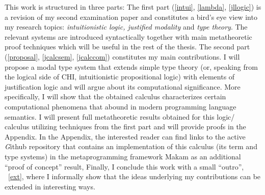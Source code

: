            This work  is structured in three parts: 
           The first part (\cref{intui}, \cref{lambda}, \cref{jllogic}) is a revision of my second examination paper and constitutes 
           a bird's eye view into my 
           research topics:  
           \emph{intuitionistic logic, justified modality} and \emph{type theory}. 
           The relevant systems are introduced syntactically together with main 
            metatheoretic proof techniques which will be useful 
           in the rest of the thesis.
           The second part (\cref{proposal}, \cref{jcalcsem}, \cref{jcalccom}) 
           constitutes my main contributions.
           I will propose  
           a modal type system that extends simple type theory
            (or, speaking from the logical side of \ac{CHI}, 
           intuitionistic propositional logic) with elements of
            justification logic and will argue about its computational significance. 
            More specifically, I will show  
           that the obtained calculus characterizes  certain 
           computational phenomena that abound in modern programming language semantics. 
           I will present full metatheoretic
           results obtained for this logic/ calculus utilizing techniques from the first part 
           and will provide proofs in the Appendix. 
           In the Appendix, the interested reader can find links to the active 
           {\textit Github} repository 
           that contains an implementation of  this calculus 
           (its term and type systems)
           in the metaprogramming framework {\sf Makam} 
           as an additional  ``proof of concept'' result,  
           Finally, I conclude this work with a small ``outro'', ~\cref{ext},
           where I informally show that the ideas underlying my contributions 
           can be extended in interesting ways.



